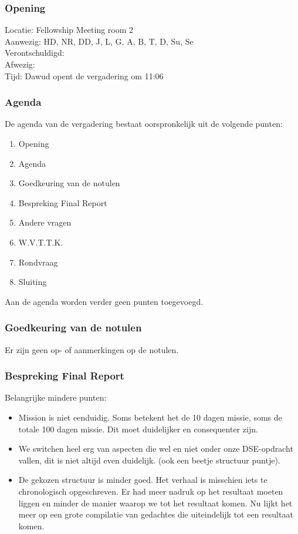 \subsubsection{Opening}
Locatie: Fellowship Meeting room 2\\
Aanwezig: HD, NR, DD, J, L, G, A, B, T, D, Su, Se\\
Verontschuldigd: \\
Afwezig: \\
Tijd: Dawud opent de vergadering om 11:06\\

\subsubsection{Agenda}
De agenda van de vergadering bestaat oorspronkelijk uit de volgende punten:
\begin{enumerate}
\item Opening
\item Agenda
\item Goedkeuring van de notulen
\item Bespreking Final Report
\item Andere vragen
\item W.V.T.T.K.
\item Rondvraag
\item Sluiting
\end{enumerate}

Aan de agenda worden verder geen punten toegevoegd.

\subsubsection{Goedkeuring van de notulen}
Er zijn geen op- of aanmerkingen op de notulen.

\subsubsection{Bespreking Final Report}
Belangrijke mindere punten:\newline
\begin{itemize}
	\item Mission is niet eenduidig. Soms betekent het de 10 dagen missie, soms de totale 100 dagen missie. Dit moet duidelijker en consequenter zijn.
	\item We switchen heel erg van aspecten die wel en niet onder onze DSE-opdracht vallen, dit is niet altijd even duidelijk. (ook een beetje structuur puntje).
	\item De gekozen structuur is minder goed. Het verhaal is misschien iets te chronologisch opgeschreven. Er had meer nadruk op het resultaat moeten liggen en minder de manier waarop we tot het resultaat komen. Nu lijkt het meer op een grote compilatie van gedachtes die uiteindelijk tot een resultaat komen.
\end{itemize}

